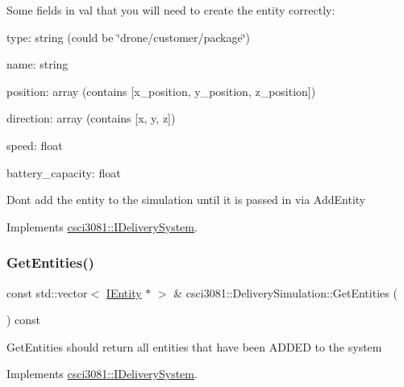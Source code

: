 Some fields in val that you will need to create the entity correctly\+:

type\+: string (could be \char`\"{}drone/customer/package\char`\"{})

name\+: string

position\+: array (contains \mbox{[}x\+\_\+position, y\+\_\+position, z\+\_\+position\mbox{]})

direction\+: array (contains \mbox{[}x, y, z\mbox{]})

speed\+: float

battery\+\_\+capacity\+: float

Don\textquotesingle{}t add the entity to the simulation until it is passed in via Add\+Entity 

Implements \hyperlink{classcsci3081_1_1IDeliverySystem_abc1959b16d1fcfdeea2a2d8af0733301}{csci3081\+::\+I\+Delivery\+System}.

\mbox{\label{classcsci3081_1_1DeliverySimulation_a3d027c435dcc4386da1bf688aae4e21a}} 
\subsubsection{\texorpdfstring{Get\+Entities()}{GetEntities()}}
{\footnotesize\ttfamily const std\+::vector$<$ \hyperlink{classentity__project_1_1IEntity}{I\+Entity} $\ast$ $>$ \& csci3081\+::\+Delivery\+Simulation\+::\+Get\+Entities (\begin{DoxyParamCaption}{ }\end{DoxyParamCaption}) const\hspace{0.3cm}{\ttfamily [virtual]}}

Get\+Entities should return all entities that have been A\+D\+D\+ED to the system 

Implements \hyperlink{classcsci3081_1_1IDeliverySystem_aca4e7e3e9a9a19ca87f788935b882277}{csci3081\+::\+I\+Delivery\+System}.

\mbox{\label{classcsci3081_1_1DeliverySimulation_a8ffa78cd68b1d3cc347436f63639431c}} 
